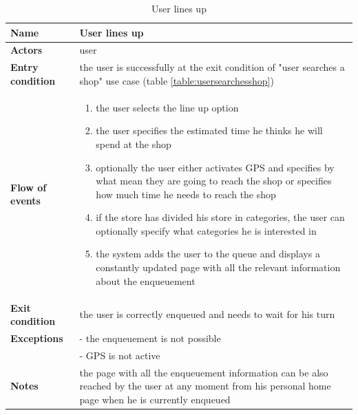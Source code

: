 \begin{table}[h!]
    \centering
    \begin{tabular}{@{}P{0.2\textwidth}P{0.70\textwidth}@{}}
        \toprule
        \textbf{Name}                 & User lines up\\
        \midrule
        \textbf{Actors}               & user\\
        \textbf{Entry condition}      & the user is successfully at the exit condition of "user searches a shop" use case (table \ref{table:usersearchesshop})\\
        \textbf{Flow of events}       & 
        \begin{enumerate}[nolistsep, leftmargin=*]
            \item the user selects the line up option
            \item the user specifies the estimated time he thinks he will spend at the shop
            \item optionally the user either activates GPS and specifies by what mean they are going to reach the shop or specifies how much time he needs to reach the shop
            \item if the store has divided his store in categories, the user can optionally specify what categories he is interested in
            \item the system adds the user to the queue and displays a constantly updated page with all the relevant information about the enqueuement
        \end{enumerate} \\
        \textbf{Exit condition}       & the user is correctly enqueued and needs to wait for his turn\\
        \textbf{Exceptions}           
        & - the enqueuement is not possible\\ %
        & - GPS is not active\\
        \textbf{Notes} & the page with all the enqueuement information can be also reached by the user at any moment from his personal home page when he is currently enqueued\\
        \bottomrule
    \end{tabular}
\caption{User lines up}
\label{table:userlinesup}
\end{table}

